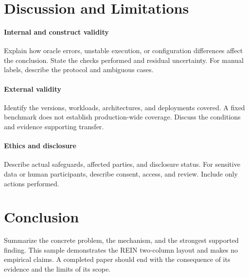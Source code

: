 \section{Discussion and Limitations}
\paragraph{Internal and construct validity}
Explain how oracle errors, unstable execution, or configuration differences
affect the conclusion. State the checks performed and residual uncertainty.
For manual labels, describe the protocol and ambiguous cases.

\paragraph{External validity}
Identify the versions, workloads, architectures, and deployments covered.
A fixed benchmark does not establish production-wide coverage. Discuss
the conditions and evidence supporting transfer.

\paragraph{Ethics and disclosure}
Describe actual safeguards, affected parties, and disclosure status.
For sensitive data or human participants, describe consent, access,
and review. Include only actions performed.

\section{Conclusion}
Summarize the concrete problem, the mechanism, and the strongest supported
finding. This sample demonstrates the REIN two-column layout and makes no
empirical claims. A completed paper should end with the consequence of its
evidence and the limits of its scope.

